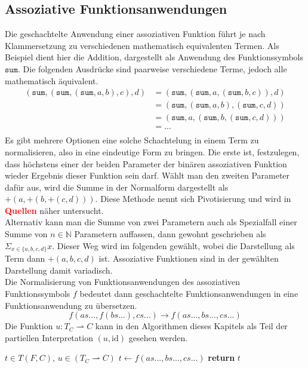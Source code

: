 \documentclass{scrartcl}
\numberwithin{figure}{section} %
\theoremstyle{definition} %
\begin{document}
\subsection {Assoziative Funktionsanwendungen}
Die geschachtelte Anwendung einer assoziativen Funktion führt je nach Klammersetzung zu verschiedenen mathematisch equivalenten Termen. Als Beispiel dient hier die Addition, dargestellt als Anwendung des Funktionssymbols $\texttt{sum}$. Die folgenden Ausdrücke sind paarweise verschiedene Terme, jedoch alle mathematisch äquivalent.
\begin{equation*}
	\begin{split}
	   (\texttt{sum}, (\texttt{sum}, (\texttt{sum}, a, b), c), d) 
    &= (\texttt{sum}, (\texttt{sum}, a, (\texttt{sum}, b, c)), d)\\
	&= (\texttt{sum}, (\texttt{sum}, a, b), (\texttt{sum}, c, d))\\
	&= (\texttt{sum}, a, (\texttt{sum}, b, (\texttt{sum}, c, d)))\\
	&= \dots \\
	\end{split}
\end{equation*}
Es gibt mehrere Optionen eine solche Schachtelung in einem Term zu normalisieren, also in eine eindeutige Form zu bringen. Die erste ist, festzulegen, dass höchstens einer der beiden Parameter der binären assoziativen Funktion wieder Ergebnis dieser Funktion sein darf. Wählt man den zweiten Parameter dafür aus, wird die Summe in der Normalform dargestellt als $+(a, +(b, +(c, d)))$. Diese Methode nennt sich Pivotisierung und wird in \textcolor{red}{\textbf{Quellen}} näher untersucht.\\
Alternativ kann man die Summe von zwei Parametern auch als Spezialfall einer Summe von $n \in \mathbb{N}$ Parametern auffassen, dann gewohnt geschrieben als $\Sigma_{x \in \{a, b, c, d\}} x$. Dieser Weg wird im folgenden gewählt, wobei die Darstellung als Term dann $+(a, b, c, d)$ ist. Assoziative Funktionen sind in der gewählten Darstellung damit variadisch. \\
Die Normalisierung von Funktionsanwendungen des assoziativen Funktionssymbols $f$ bedeutet dann geschachtelte Funktionsanwendungen in eine Funktionsanwendung zu übersetzen. 
$$f(as..., f(bs...), cs...) \rightarrow f(as..., bs..., cs...)$$
Die Funktion $u \colon T_C \rightharpoonup C$ kann in den Algorithmen dieses Kapitels als Teil der partiellen Interpretation $(u, \mathrm{id})$ gesehen werden. 

\begin{algorithm}
\caption{$\mathrm{flatten} \colon T \times (T_C \rightharpoonup C) \rightarrow T$}\label{flatten}
\begin{algorithmic}[1] %
\Require $t \in T(F, C)$, $u \in (T_C \rightharpoonup C)$
		\State $t \leftarrow f(as..., bs..., cs...)$
	\EndWhile
\EndIf
\State \textbf{return} $t$ 
\end{algorithmic}
\end{algorithm}
\end{document}
